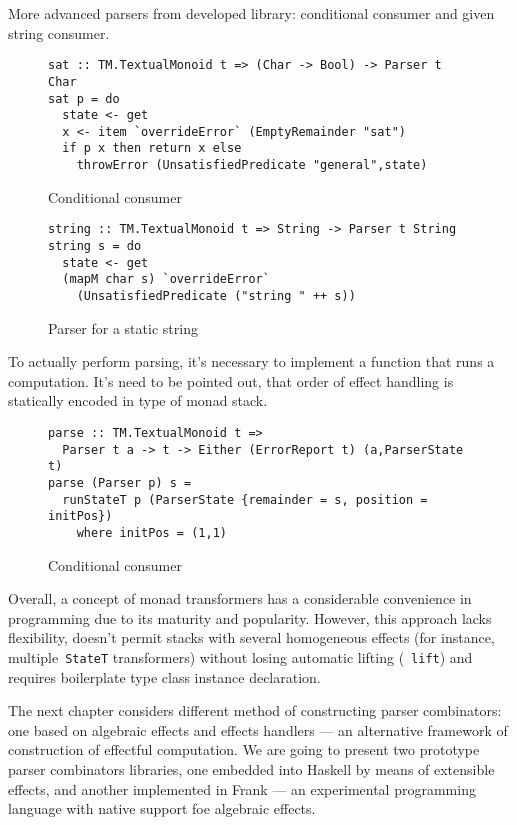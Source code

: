       More advanced parsers from developed library: conditional consumer and
      given string consumer.

      \begin{figure}[h]
      \begin{lstlisting}
sat :: TM.TextualMonoid t => (Char -> Bool) -> Parser t Char
sat p = do
  state <- get
  x <- item `overrideError` (EmptyRemainder "sat")
  if p x then return x else
    throwError (UnsatisfiedPredicate "general",state)
      \end{lstlisting}
      \caption{Conditional consumer}
      \label{listing:mtlParserSat}
      \end{figure}

      \begin{figure}[h]
      \begin{lstlisting}
string :: TM.TextualMonoid t => String -> Parser t String
string s = do
  state <- get
  (mapM char s) `overrideError`
    (UnsatisfiedPredicate ("string " ++ s))
      \end{lstlisting}
      \caption{Parser for a static string}
      \label{listing:mtlParserString}
      \end{figure}

      To actually perform parsing, it's necessary to implement a function that
      runs a computation. It's need to be
      pointed out, that order of effect handling is statically encoded in type of
      monad stack.

      \begin{figure}[h]
      \begin{lstlisting}
parse :: TM.TextualMonoid t =>
  Parser t a -> t -> Either (ErrorReport t) (a,ParserState t)
parse (Parser p) s =
  runStateT p (ParserState {remainder = s, position = initPos})
    where initPos = (1,1)
      \end{lstlisting}
      \caption{Conditional consumer}
      \label{listing:mtlParserSta}
      \end{figure}

      Overall, a concept of monad transformers has a considerable convenience in programming due to
      its maturity and popularity. However, this
      approach lacks flexibility, doesn't permit stacks with several homogeneous
      effects (for instance, multiple~\texttt{StateT} transformers) without
      losing automatic lifting (~\texttt{lift}) and requires boilerplate
      type class instance declaration.

      The next chapter considers different method of constructing parser combinators: one
      based on algebraic effects and effects handlers --- an alternative framework of construction of effectful computation. We are going to present two prototype
      parser combinators libraries, one embedded into Haskell by means of extensible
      effects, and another implemented in Frank --- an experimental programming language
      with native support foe algebraic effects.